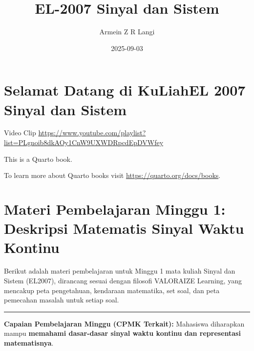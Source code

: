 \documentclass[
  letterpaper,
  DIV=11,
  numbers=noendperiod]{scrreprt}
\title{EL-2007 Sinyal dan Sistem}
\author{Armein Z R Langi}
\date{2025-09-03}
\renewcommand*\contentsname{Table of contents}
\newcommand\contentsname{Table of contents}
\begin{document}
\maketitle

\renewcommand*\contentsname{Table of contents}
{
\hypersetup{linkcolor=}
\setcounter{tocdepth}{2}
\tableofcontents
}


\chapter*{Selamat Datang di KuLiahEL 2007 Sinyal dan
Sistem}\label{selamat-datang-di-kuliahel-2007-sinyal-dan-sistem}


Video Clip
\url{https://www.youtube.com/playlist?list=PLgnoib8dkAOy1CnW9UXWDRpcdEpDVWfey}

This is a Quarto book.

To learn more about Quarto books visit
\url{https://quarto.org/docs/books}.


\chapter{}\label{section}


\chapter{Materi Pembelajaran Minggu 1: Deskripsi Matematis Sinyal Waktu
Kontinu}\label{materi-pembelajaran-minggu-1-deskripsi-matematis-sinyal-waktu-kontinu}

Berikut adalah materi pembelajaran untuk Minggu 1 mata kuliah Sinyal dan
Sistem (EL2007), dirancang sesuai dengan filosofi VALORAIZE Learning,
yang mencakup peta pengetahuan, kendaraan matematika, set soal, dan peta
pemecahan masalah untuk setiap soal.

\begin{center}\rule{0.5\linewidth}{0.5pt}\end{center}

\textbf{Capaian Pembelajaran Minggu (CPMK Terkait):} Mahasiswa
diharapkan mampu \textbf{memahami dasar-dasar sinyal waktu kontinu dan
representasi matematisnya}.
\end{document}
